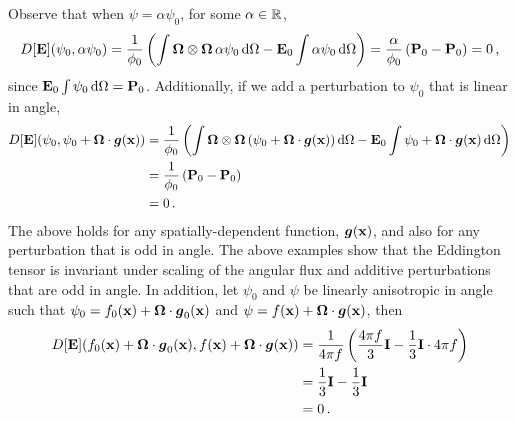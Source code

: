 \documentclass[../doc.tex]{subfiles}
\begin{document}
Observe that when $\psi = \alpha \psi_0$, for some $\alpha \in \R$, 
	\begin{equation}
		D[\E](\psi_0,\alpha\psi_0) = \frac{1}{\phi_0}\paren{\int \Omegahat\otimes\Omegahat\,\alpha\psi_0 \ud\Omega - \E_0 \int \alpha \psi_0 \ud \Omega} = \frac{\alpha}{\phi_0}\paren{\P_0 - \P_0} = 0 \,,
	\end{equation}
since $\E_0 \int \psi_0 \ud \Omega = \P_0$. Additionally, if we add a perturbation to $\psi_0$ that is linear in angle, 
	\begin{equation}
	\begin{aligned}
		D[\E](\psi_0, \psi_0 + \Omegahat\cdot\vec{g}(\x)) &= \frac{1}{\phi_0}\paren{\int \Omegahat\otimes\Omegahat\paren{\psi_0 + \Omegahat\cdot\vec{g}(\x)}\ud \Omega - \E_0 \int \psi_0 + \Omegahat\cdot\vec{g}(\x) \ud \Omega}\\
		&= \frac{1}{\phi_0} \paren{\P_0 - \P_0} \\
		&= 0 \,. 
	\end{aligned}
	\end{equation}
The above holds for any spatially-dependent function, $\vec{g}(\x)$, and also for any perturbation that is odd in angle. 
The above examples show that the Eddington tensor is invariant under scaling of the angular flux and additive perturbations that are odd in angle. In addition, let $\psi_0$ and $\psi$ be linearly anisotropic in angle such that $\psi_0 = f_0(\x) + \Omegahat\cdot\vec{g}_0(\x)$ and $\psi = f(\x) + \Omegahat\cdot\vec{g}(\x)$, then 
	\begin{equation}
	\begin{aligned}
		D[\E](f_0(\x) + \Omegahat\cdot\vec{g}_0(\x), f(\x) + \Omegahat\cdot\vec{g}(\x)) &= \frac{1}{4\pi f}\paren{\frac{4\pi f}{3}\I - \frac{1}{3}\I \cdot 4\pi f} \\
		&= \frac{1}{3}\I - \frac{1}{3}\I \\
		&= 0 \,. 
	\end{aligned}
	\end{equation}
\end{document}
